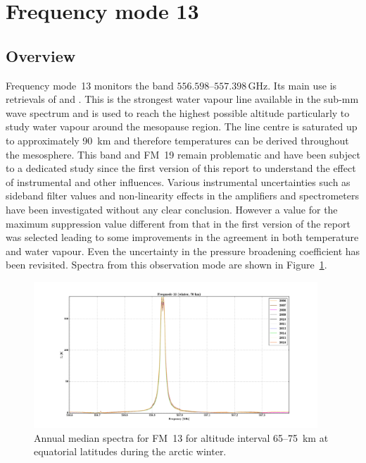 \section{Frequency mode 13}
\label{sec:fm13}

\subsection{Overview}
\label{sec:fm13:overview}
Frequency mode~13 monitors the band $556.598$--$557.398\,\mathrm{GHz}$. Its
main use is retrievals of  and .
This is the strongest water vapour line available in the sub-mm wave spectrum
and is used to reach the  highest possible altitude particularly to study
water vapour around the mesopause region.  The line centre is saturated up to
approximately 90~km and therefore temperatures can be derived throughout the
mesosphere. This band and FM~19 remain problematic and have been subject to a 
dedicated study since the first version of this report  to understand the effect of instrumental 
and other influences.  Various instrumental uncertainties such as sideband filter values and non-linearity effects in the amplifiers and spectrometers have been investigated without any clear conclusion.  However a value for the maximum suppression value different from that in the first version of the report was selected leading to some improvements in the agreement in both temperature and water vapour.   Even the uncertainty in the pressure broadening coefficient has been revisited.  
Spectra from this observation mode are shown in Figure~\ref{fig:spectra:13}.

\begin{figure}[ht]
    \centering
    \includegraphics[width=0.95\textwidth]{../DDS/figures/spectra/fm_13_spectra_winter}
    \caption{Annual median spectra for FM~13 for altitude interval 65--75~km at
        equatorial latitudes during the arctic winter.
    }\label{fig:spectra:13}
\end{figure}


